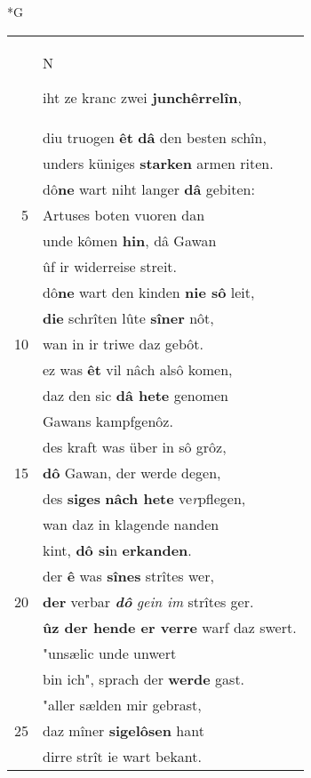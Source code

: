 \documentclass[8pt,a4paper,notitlepage]{article}
\begin{document}
\begin{table}[ht]
\begin{minipage}[t]{0.5\linewidth}
\small
\begin{center}*G
\end{center}
\begin{tabular}{rl}
 & \begin{large}N\end{large}iht ze kranc zwei \textbf{junchêrrelîn},\\ 
 & diu truogen \textbf{êt} \textbf{dâ} den besten schîn,\\ 
 & unders küniges \textbf{starken} armen riten.\\ 
 & dô\textbf{ne} wart niht langer \textbf{dâ} gebiten:\\ 
5 & Artuses boten vuoren dan\\ 
 & unde kômen \textbf{hin}, dâ Gawan\\ 
 & ûf ir widerreise streit.\\ 
 & dô\textbf{ne} wart den kinden \textbf{nie sô} leit,\\ 
 & \textbf{die} schrîten lûte \textbf{sîner} nôt,\\ 
10 & wan in ir triwe daz gebôt.\\ 
 & ez was \textbf{êt} vil nâch alsô komen,\\ 
 & daz den sic \textbf{dâ hete} genomen\\ 
 & Gawans kampfgenôz.\\ 
 & des kraft was über in sô grôz,\\ 
15 & \textbf{dô} Gawan, der werde degen,\\ 
 & des \textbf{siges} \textbf{nâch hete} ve\textit{r}pflegen,\\ 
 & wan daz in klagende nanden\\ 
 & kint, \textbf{dô si}n \textbf{erkanden}.\\ 
 & der \textbf{ê} was \textbf{sînes} strîtes wer,\\ 
20 & \textbf{der} verbar \textit{\textbf{dô}} \textit{gein im} strîtes ger.\\ 
 & \textbf{ûz der hende er verre} warf daz swert.\\ 
 & "unsælic unde unwert\\ 
 & bin ich", sprach der \textbf{werde} gast.\\ 
 & "aller sælden mir gebrast,\\ 
25 & daz mîner \textbf{sigelôsen} hant\\ 
 & dirre strît ie wart bekant.\\ 

\end{tabular}
\end{minipage}
\end{table}
\end{document}
